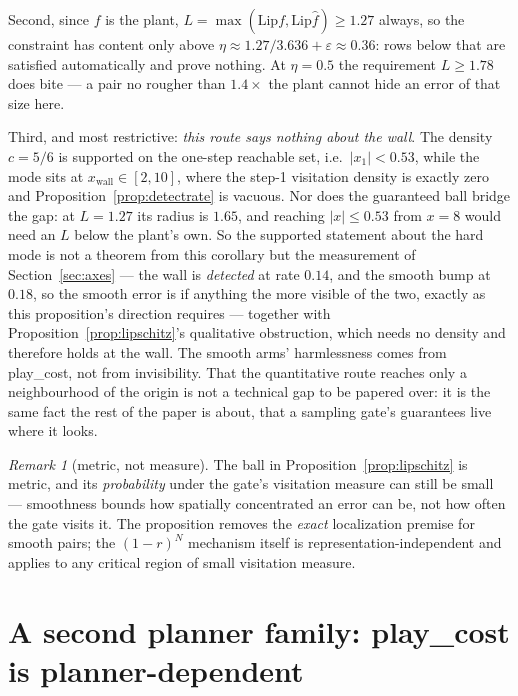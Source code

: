 \documentclass[11pt]{article}
\theoremstyle{definition}
\theoremstyle{remark}
\newtheorem{remark}{Remark}
\begin{document}
Second, since $f$ is the plant, $L = \max(\mathrm{Lip} f, \mathrm{Lip}\hat f) \geq 1.27$ always, so the constraint has content only above $\eta \approx 1.27/3.636 + \varepsilon \approx 0.36$: rows below that are satisfied automatically and prove nothing. At $\eta = 0.5$ the requirement $L \geq 1.78$ does bite --- a pair no rougher than $1.4\times$ the plant cannot hide an error of that size here.

Third, and most restrictive: \emph{this route says nothing about the wall}. The density $c = 5/6$ is supported on the one-step reachable set, i.e.\ $|x_1| < 0.53$, while the mode sits at $x_\mathrm{wall} \in [2,10]$, where the step-1 visitation density is exactly zero and Proposition~\ref{prop:detectrate} is vacuous. Nor does the guaranteed ball bridge the gap: at $L = 1.27$ its radius is $1.65$, and reaching $|x| \leq 0.53$ from $x = 8$ would need an $L$ below the plant's own. So the supported statement about the hard mode is not a theorem from this corollary but the measurement of Section~\ref{sec:axes} --- the wall is \emph{detected} at rate $0.14$, and the smooth bump at $0.18$, so the smooth error is if anything the more visible of the two, exactly as this proposition's direction requires --- together with Proposition~\ref{prop:lipschitz}'s qualitative obstruction, which needs no density and therefore holds at the wall. The smooth arms' harmlessness comes from play\_cost, not from invisibility. That the quantitative route reaches only a neighbourhood of the origin is not a technical gap to be papered over: it is the same fact the rest of the paper is about, that a sampling gate's guarantees live where it looks.


\begin{remark}[metric, not measure]
The ball in Proposition~\ref{prop:lipschitz} is metric, and its \emph{probability} under the gate's visitation measure can still be small --- smoothness bounds how spatially concentrated an error can be, not how often the gate visits it. The proposition removes the \emph{exact} localization premise for smooth pairs; the $(1-r)^N$ mechanism itself is representation-independent and applies to any critical region of small visitation measure.
\end{remark}


\section{A second planner family: play\_cost is planner-dependent}
\label{sup:cem}
\label{sec:cem}
\end{document}
